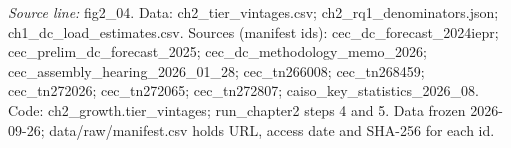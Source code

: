 {\scriptsize\textit{Source line:} fig2\_\allowbreak{}04. Data: ch2\_\allowbreak{}tier\_\allowbreak{}vintages.csv; ch2\_\allowbreak{}rq1\_\allowbreak{}denominators.json; ch1\_\allowbreak{}dc\_\allowbreak{}load\_\allowbreak{}estimates.csv. Sources (manifest ids): cec\_\allowbreak{}dc\_\allowbreak{}forecast\_\allowbreak{}2024iepr; cec\_\allowbreak{}prelim\_\allowbreak{}dc\_\allowbreak{}forecast\_\allowbreak{}2025; cec\_\allowbreak{}dc\_\allowbreak{}methodology\_\allowbreak{}memo\_\allowbreak{}2026; cec\_\allowbreak{}assembly\_\allowbreak{}hearing\_\allowbreak{}2026\_\allowbreak{}01\_\allowbreak{}28; cec\_\allowbreak{}tn266008; cec\_\allowbreak{}tn268459; cec\_\allowbreak{}tn272026; cec\_\allowbreak{}tn272065; cec\_\allowbreak{}tn272807; caiso\_\allowbreak{}key\_\allowbreak{}statistics\_\allowbreak{}2026\_\allowbreak{}08. Code: ch2\_\allowbreak{}growth.tier\_\allowbreak{}vintages; run\_\allowbreak{}chapter2 steps 4 and 5. Data frozen 2026-09-26; data/raw/manifest.csv holds URL, access date and SHA-256 for each id.}